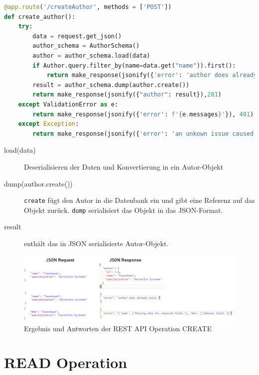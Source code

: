 \documentclass[a4paper,titlepage,halfparskip,12pt,listof=numbered]{scrreprt}
\begin{document}
\begin{lstlisting}[language=python,caption={Code für die CREATE Operation der CRUD-Applikation}, label={lst:createOperationAPI}]
@app.route('/createAuthor', methods = ['POST'])
def create_author():
    try:
        data = request.get_json()
        author_schema = AuthorSchema()
        author = author_schema.load(data)
        if Author.query.filter_by(name=data.get("name")).first():
            return make_response(jsonify({'error': 'author does already exist.'}), 401)
        result = author_schema.dump(author.create())
        return make_response(jsonify({"author": result}),201)
    except ValidationError as e:
        return make_response(jsonify({'error': f'{e.messages}'}), 401)
    except Exception:
        return make_response(jsonify({'error': 'an unkown issue caused this error.'}), 500)
\end{lstlisting}

\bigskip

\begin{description}
\item[load(data)] Deserialisieren der Daten und Konvertierung in ein Autor-Objekt \cite{marshmallowQuickstart}
\item[dump(author.create())] \texttt{create} fügt den Autor in die Datenbank ein und gibt eine Referenz auf das Objekt zurück. \texttt{dump} serialisiert das Objekt in das \ac{JSON}-Format.\cite{marshmallowQuickstart}
\item[result] enthält das in \ac{JSON} serialisierte Autor-Objekt.
\end{description}

\bigskip

\begin{figure}[h]
	\centering
	\includegraphics[width=\linewidth]{images/resultsCREATE}
	\caption{Ergebnis und Antworten der \ac{REST} \ac{API} Operation CREATE}
	\label{img:resultsCREATE}
\end{figure}

\pagebreak

\section{READ Operation}
\end{document}

